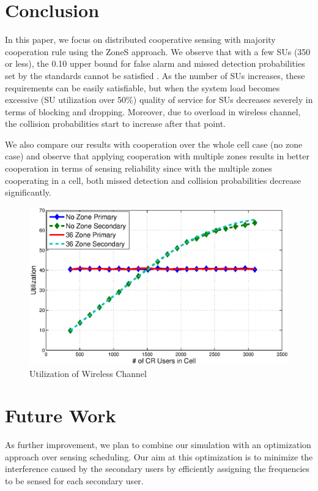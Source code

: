 \documentclass[conference,compsoc]{IEEEtran}
\begin{document}
\section{\label{sec:conclusion}Conclusion}
In this paper, we focus on distributed cooperative sensing with majority cooperation rule using the ZoneS approach. We observe that with a few SUs (350 or less), the 0.10 upper bound for false alarm and missed detection probabilities set by the standards cannot be satisfied \cite{wranstandard}. As the number of SUs increases, these requirements can be easily satisfiable, but when the system load becomes excessive (SU utilization over 50\%) quality of service for SUs decreases severely in terms of blocking and dropping. Moreover, due to overload in wireless channel, the collision probabilities start to increase after that point.

We also compare our results with cooperation over the whole cell case (no zone case) and observe that applying cooperation with multiple zones results in better cooperation in terms of sensing reliability since with the multiple zones cooperating in a cell, both missed detection and collision probabilities decrease significantly.

\begin{figure}[t]
\centering
\includegraphics[width=0.99\columnwidth,keepaspectratio] {figs/util.eps}
\caption{Utilization of Wireless Channel} \label{fig:util}
\end{figure}

\section{\label{sec:future}Future Work}
As further improvement, we plan to combine our simulation with an optimization approach over sensing scheduling. Our aim at this optimization is to minimize the interference caused by the secondary users by efficiently assigning the frequencies to be sensed for each secondary user.
\end{document}
